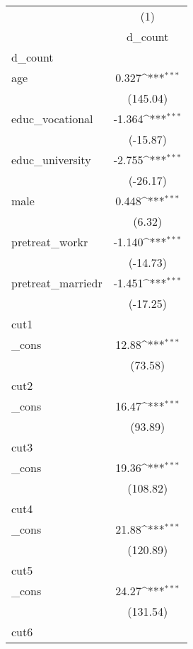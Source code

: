 {
\def\sym#1{\ifmmode^{#1}\else\(^{#1}\)\fi}
\begin{tabular}{l*{1}{c}}
\hline\hline
            &\multicolumn{1}{c}{(1)}\\
            &\multicolumn{1}{c}{d\_count}\\
\hline
d\_count     &                     \\
age         &       0.327\sym{***}\\
            &    (145.04)         \\
[1em]
educ\_vocational&      -1.364\sym{***}\\
            &    (-15.87)         \\
[1em]
educ\_university&      -2.755\sym{***}\\
            &    (-26.17)         \\
[1em]
male        &       0.448\sym{***}\\
            &      (6.32)         \\
[1em]
pretreat\_workr&      -1.140\sym{***}\\
            &    (-14.73)         \\
[1em]
pretreat\_marriedr&      -1.451\sym{***}\\
            &    (-17.25)         \\
\hline
cut1        &                     \\
\_cons      &       12.88\sym{***}\\
            &     (73.58)         \\
\hline
cut2        &                     \\
\_cons      &       16.47\sym{***}\\
            &     (93.89)         \\
\hline
cut3        &                     \\
\_cons      &       19.36\sym{***}\\
            &    (108.82)         \\
\hline
cut4        &                     \\
\_cons      &       21.88\sym{***}\\
            &    (120.89)         \\
\hline
cut5        &                     \\
\_cons      &       24.27\sym{***}\\
            &    (131.54)         \\
\hline
cut6        &                     \\

\end{tabular}}
